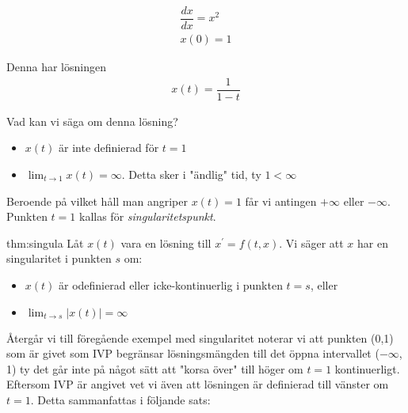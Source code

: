 \begin{equation*}
  \begin{gathered}
    \dfrac{dx}{dx} = x^2\\
    x(0)=1
  \end{gathered}
\end{equation*}\par
\noindent Denna har lösningen
\begin{equation*}
  \begin{gathered}
    x(t) = \dfrac{1}{1-t}
  \end{gathered}
\end{equation*}\par
\noindent Vad kan vi säga om denna lösning?
\par\bigskip
\begin{itemize}
  \item $x(t)$ är inte definierad för $t=1$
  \item $\lim_{t\to1}x(t)=\infty$. Detta sker i "ändlig" tid, ty $1<\infty$
\end{itemize}\par
\noindent Beroende på vilket håll man angriper $x(t)=1$ får vi antingen $+\infty$ eller $-\infty$. Punkten $t=1$ kallas för \textit{singularitetspunkt}.
\par\bigskip
\begin{theo}[Singularitet]{thm:singula}
  Låt $x(t)$ vara en lösning till $x^{\prime}=f(t,x)$. Vi säger att $x$ har en singularitet i punkten $s$ om:
  \begin{itemize}
    \item $x(t)$ är odefinierad eller icke-kontinuerlig i punkten $t=s$, eller
    \item $\lim_{t\to s}\left|x(t)\right|=\infty$
  \end{itemize}
\end{theo}\par\bigskip
\noindent Återgår vi till föregående exempel med singularitet noterar vi att punkten (0,1) som är givet som IVP begränsar lösningsmängden till det öppna intervallet ($-\infty$, 1) ty det går inte på något sätt att "korsa över" till höger om $t=1$ kontinuerligt. Eftersom IVP är angivet vet vi även att lösningen är definierad till vänster om $t=1$. Detta sammanfattas i följande sats:
\newpage

